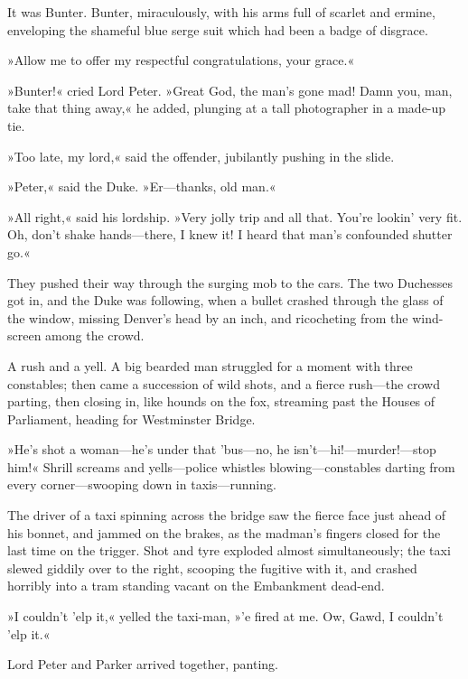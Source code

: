 It was Bunter. Bunter, miraculously, with his arms full of scarlet and ermine, enveloping the shameful blue serge suit which had been a badge of disgrace.

»Allow me to offer my respectful congratulations, your grace.«

»Bunter!« cried Lord Peter. »Great God, the man's gone mad! Damn you, man, take that thing away,« he added, plunging at a tall photographer in a made-up tie.

»Too late, my lord,« said the offender, jubilantly pushing in the slide.

»Peter,« said the Duke. »Er\allowbreak---\allowbreak thanks, old man.«

»All right,« said his lordship. »Very jolly trip and all that. You're lookin' very fit. Oh, don't shake hands\allowbreak---\allowbreak there, I knew it! I heard that man's confounded shutter go.«

They pushed their way through the surging mob to the cars. The two Duchesses got in, and the Duke was following, when a bullet crashed through the glass of the window, missing Denver's head by an inch, and ricocheting from the wind-screen among the crowd.

A rush and a yell. A big bearded man struggled for a moment with three constables; then came a succession of wild shots, and a fierce rush\allowbreak---\allowbreak the crowd parting, then closing in, like hounds on the fox, streaming past the Houses of Parliament, heading for Westminster Bridge.

»He's shot a woman\allowbreak---\allowbreak he's under that 'bus\allowbreak---\allowbreak no, he isn't\allowbreak---\allowbreak hi!---murder!---stop him!« Shrill screams and yells\allowbreak---\allowbreak police whistles blowing\allowbreak---\allowbreak constables darting from every corner\allowbreak---\allowbreak swooping down in taxis\allowbreak---\allowbreak running.

The driver of a taxi spinning across the bridge saw the fierce face just ahead of his bonnet, and jammed on the brakes, as the madman's fingers closed for the last time on the trigger. Shot and tyre exploded almost simultaneously; the taxi slewed giddily over to the right, scooping the fugitive with it, and crashed horribly into a tram standing vacant on the Embankment dead-end.

»I couldn't 'elp it,« yelled the taxi-man, »'e fired at me. Ow, Gawd, I couldn't 'elp it.«

Lord Peter and Parker arrived together, panting.

